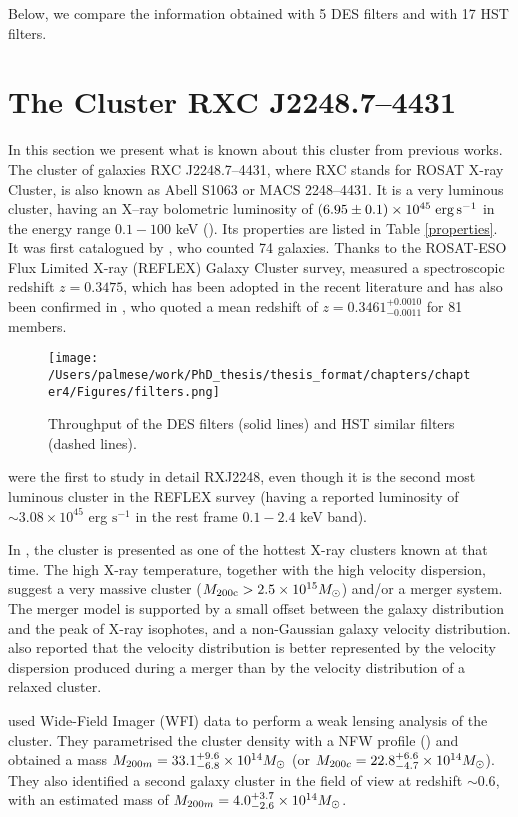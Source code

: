 {Below, we compare the information obtained with 5 DES filters and with 17 HST filters.

\section{The Cluster RXC J2248.7--4431}\label{previousworks}
In this section we present what is known about this cluster from previous works. The cluster of galaxies RXC J2248.7--4431, where RXC stands for ROSAT X-ray Cluster, is also known as Abell S1063 or MACS 2248--4431. It is a very luminous cluster, having an X--ray bolometric luminosity of $(6.95 \pm 0.1)\times 10^{45}\; {\rm erg\, s^{-1}}$ in the energy range $0.1-100$ keV (\citealt{maughan08}). Its properties are listed in Table \ref{properties}. It  was first catalogued by \citet{abell}, who counted 74 galaxies. Thanks to the ROSAT-ESO Flux Limited X-ray (REFLEX) Galaxy Cluster survey, \citet{bohr} measured a spectroscopic redshift $z=0.3475$, which has been adopted in the recent literature and has also been confirmed in \citet{gomez}, who quoted a mean redshift of $z=0.3461^{+0.0010}_{-0.0011}$ for 81 members.

\begin{figure}
\centering
\texttt{[image: /Users/palmese/work/PhD\_thesis/thesis\_format/chapters/chapter4/Figures/filters.png]}\caption{Throughput of the DES filters (solid lines) and HST similar filters (dashed lines).}\label{filters}
\end{figure}

\citet{gomez} were the first to study in detail RXJ2248, even though it is the second most luminous cluster in the REFLEX survey (having a reported luminosity of $\sim 3.08 \times 10^{45}$ erg $\mathrm{s}^{-1}$ in the rest frame $0.1-2.4$ keV band). 

In \citet{gomez}, the cluster is presented as one of the hottest X-ray clusters known at that time. The high X-ray temperature, together with the high velocity dispersion, suggest a very massive cluster ($M_{200\mathrm{c}}>2.5 \times 10^{15} \mbox{$M_{\odot}$}$) and/or a merger system. The merger model is supported by a small offset between the galaxy distribution and the peak of X-ray isophotes, and a non-Gaussian galaxy velocity distribution. \citet{gomez} also reported that the velocity distribution is better represented by the velocity dispersion produced during a merger than by the velocity distribution of a relaxed cluster.

\citet{gruen} used Wide-Field Imager (WFI) data to perform a weak lensing analysis of the cluster. They parametrised the cluster density with a NFW profile (\citealt{nfw}) and obtained a mass $M_{200m}=33.1^{+9.6}_{-6.8}\times 10^{14}\mbox{$M_{\odot}$}$ (or $M_{200c} = 22.8 ^{+6.6}_{-4.7}\times 10^{14} \mbox{$M_{\odot}$}$). They also identified a second galaxy cluster in the field of view at redshift $\sim 0.6$, with an estimated mass of $M_{200m}=4.0^{+3.7}_{-2.6}\times10^{14}\mbox{$M_{\odot}$}$.

}
